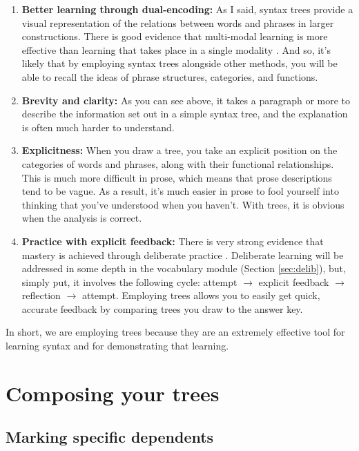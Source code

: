 \begin{enumerate}[noitemsep]
    \item \textbf{Better learning through dual-encoding:} As I said, syntax trees provide a visual representation of the relations between words and phrases in larger constructions. There is good evidence that multi-modal learning is more effective than learning that takes place in a single modality \citep{ginns2005}. And so, it's likely that by employing syntax trees alongside other methods, you will be able to recall the ideas of phrase structures, categories, and functions.
    \item \textbf{Brevity and clarity:} As you can see above, it takes a paragraph or more to describe the information set out in a simple syntax tree, and the explanation is often much harder to understand.
    \item \textbf{Explicitness:} When you draw a tree, you take an explicit position on the categories of words and phrases, along with their functional relationships. This is much more difficult in prose, which means that prose descriptions tend to be vague. As a result, it's much easier in prose to fool yourself into thinking that you've understood when you haven't. With trees, it is obvious when the analysis is correct.
    \item \textbf{Practice with explicit feedback:} There is very strong evidence that mastery is achieved through deliberate practice \citep{ericsson1993}. Deliberate learning will be addressed in some depth in the vocabulary module (Section \ref{sec:delib}), but, simply put, it involves the following cycle: attempt $\rightarrow$ explicit feedback $\rightarrow$ reflection $\rightarrow$ attempt. Employing trees allows you to easily get quick, accurate feedback by comparing trees you draw to the answer key.
\end{enumerate}

\noindent In short, we are employing trees because they are an extremely effective tool for learning syntax and for demonstrating that learning.

\section{Composing your trees}

\subsection{Marking specific dependents}\label{sec:MardDeps}

